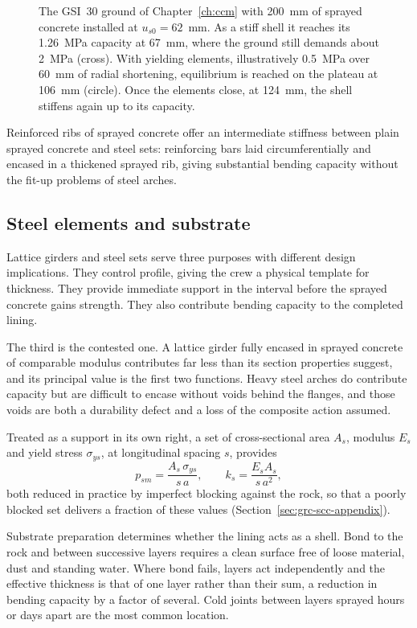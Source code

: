 \begin{figure}[htbp]
\centering
{}
\caption{The GSI~30 ground of Chapter~\ref{ch:ccm} with 200~mm of sprayed concrete installed at $u_{s0} = 62$~mm. As a stiff shell it reaches its 1.26~MPa capacity at 67~mm, where the ground still demands about 2~MPa (cross). With yielding elements, illustratively 0.5~MPa over 60~mm of radial shortening, equilibrium is reached on the plateau at 106~mm (circle). Once the elements close, at 124~mm, the shell stiffens again up to its capacity.}
\label{fig:yielding-support}
\end{figure}

Reinforced ribs of sprayed concrete offer an intermediate stiffness between
plain sprayed concrete and steel sets: reinforcing bars laid circumferentially and
encased in a thickened sprayed rib, giving substantial bending capacity
without the fit-up problems of steel arches.

\subsection{Steel elements and substrate}
\label{sec:steel-and-substrate}

Lattice girders and steel sets serve three purposes with
different design implications. They control profile, giving
the crew a physical template for thickness. They provide immediate support in
the interval before the sprayed concrete gains strength. They also contribute bending
capacity to the completed lining.

The third is the contested one. A lattice girder fully encased in sprayed
concrete of comparable modulus contributes far less than its section
properties suggest, and its principal value is the first two functions. Heavy
steel arches do contribute capacity but are difficult to encase without
voids behind the flanges, and those voids are both a durability defect and a
loss of the composite action assumed.

Treated as a support in its own right, a set of cross-sectional area $A_s$,
modulus $E_s$ and yield stress $\sigma_{ys}$, at longitudinal spacing $s$,
provides~\citep{hoekbrown1980underground,carranza2000ccm}
\[
p_{sm} = \frac{A_s\, \sigma_{ys}}{s\, a}, \qquad
k_s = \frac{E_s A_s}{s\, a^2},
\]
both reduced in practice by imperfect blocking against the rock, so that a
poorly blocked set delivers a fraction of these values
(Section~\ref{sec:grc-scc-appendix}).

Substrate preparation determines whether the lining acts as a shell.
Bond to the rock and between successive layers requires a clean surface free
of loose material, dust and standing water. Where bond fails, layers act
independently and the effective thickness is that of one layer rather than
their sum, a reduction in bending capacity by a factor of several. Cold
joints between layers sprayed hours or days apart are the most common
location.

